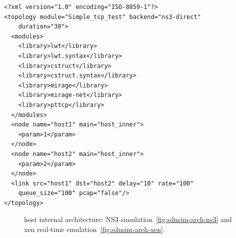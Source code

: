 \lstset{language=XML,
numberstyle=\footnotesize,
basicstyle=\ttfamily\footnotesize,
captionpos=b,
}
\begin{lstlisting}[caption={A sample \sdnsim configuration file interconnecting
  a server and a client host},label={lst:sdnsim-conf}]
<?xml version="1.0" encoding="ISO-8859-1"?>
<topology module="Simple_tcp_test" backend="ns3-direct" 
    duration="30">
  <modules>
    <library>lwt</library>
    <library>lwt.syntax</library>
    <library>cstruct</library>
    <library>cstruct.syntax</library>
    <library>mirage</library>
    <library>mirage-net</library>
    <library>pttcp</library>
  </modules>
  <node name="host1" main="host_inner"> 
    <param>1</param>
  </node>
  <node name="host2" main="host_inner"> 
    <param>2</param>
  </node>
  <link src="host1" dst="host2" delay="10" rate="100" 
    queue_size="100" pcap="false"/>
</topology>
\end{lstlisting}

\begin{figure}
\centering
{}
\caption{\sdnsim host internal architecture: NS3
  simulation~\ref{fig:sdnsim-arch-ns3} and xen real-time
  emulation~\ref{fig:sdnsim-arch-xen}.}
\label{fig:sdnsim-arch}
\end{figure}


